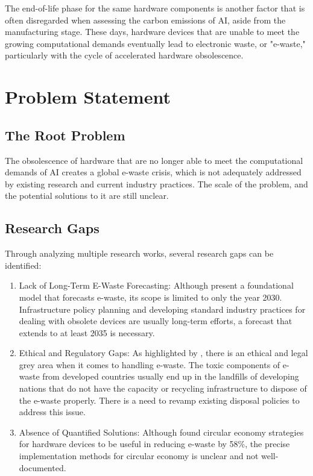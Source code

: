 \documentclass[a4paper, 12pt]{article}
\begin{document}
\par The end-of-life phase for the same hardware components is another factor that is often disregarded when assessing the carbon emissions of AI, aside from the manufacturing stage.  These days, hardware devices that are unable to meet the growing computational demands eventually lead to electronic waste, or "e-waste," particularly with the cycle of accelerated hardware obsolescence.

\section{Problem Statement}
\subsection*{The Root Problem}
The obsolescence of hardware that are no longer able to meet the computational demands of AI creates a global e-waste crisis, which is not adequately addressed by existing research and current industry practices. The scale of the problem, and the potential solutions to it are still unclear.

\subsection*{Research Gaps}
Through analyzing multiple research works, several research gaps can be identified: 
\begin{enumerate} 
	\item Lack of Long-Term E-Waste Forecasting: Although \citet{wang_2024_ewaste} present a foundational model that forecasts e-waste, its scope is limited to only the year 2030. Infrastructure policy planning and developing standard industry practices for dealing with obsolete devices are usually long-term efforts, a forecast that extends to at least 2035 is necessary. 
	
	\item Ethical and Regulatory Gaps: As highlighted by \citet{Zhuk2023}, there is an ethical and legal grey area when it comes to handling e-waste. The toxic components of e-waste from developed countries usually end up in the landfills of developing nations that do not have the capacity or recycling infrastructure to dispose of the e-waste properly. There is a need to revamp existing disposal policies to address this issue.
	
	\item Absence of Quantified Solutions: Although \citet{wang_2024_ewaste} found circular economy strategies for hardware devices to be useful in reducing e-waste by 58\%, the precise implementation methods for circular economy is unclear and not well-documented.
\end{enumerate}
\end{document}
